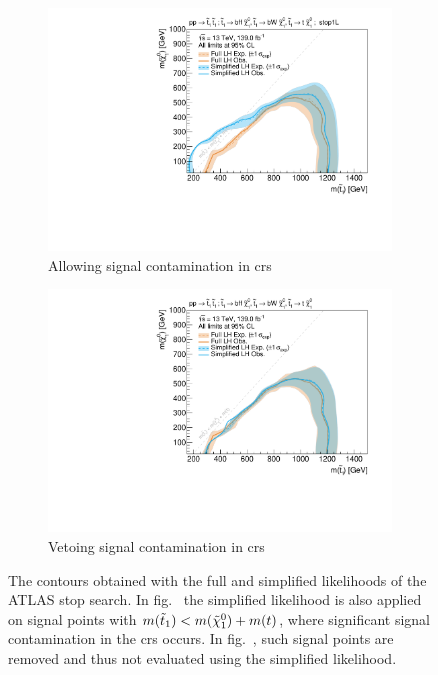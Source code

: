 \begin{figure}
	\centering
	\begin{subfigure}[b]{0.5\textwidth}
		\centering\includegraphics[width=\textwidth]{exclusion_stop1L_withCRs_noLabel_v2}
		\caption{Allowing signal contamination in \glspl{cr}\label{fig:exclusion_stop1L_noLabel_v2_withCRs}}
	\end{subfigure}\hfill
	\begin{subfigure}[b]{0.5\textwidth}
		\centering\includegraphics[width=\textwidth]{exclusion_stop1L_noLabel_v2}
		\caption{Vetoing signal contamination in \glspl{cr}\label{fig:exclusion_stop1L_noLabel_v2_withoutCRs}}
	\end{subfigure}\hfill
	\caption{The contours obtained with the full and simplified likelihoods of the ATLAS stop search. In fig.~ the simplified likelihood is also applied on signal points with $m(\tilde{t}_1) < m(\tilde{\chi}_1^0)+m(t)$, where significant signal contamination in the \glspl{cr} occurs. In fig.~, such signal points are removed and thus not evaluated using the simplified likelihood.}\label{fig:limitations_simplied_stop1l}
\end{figure}

